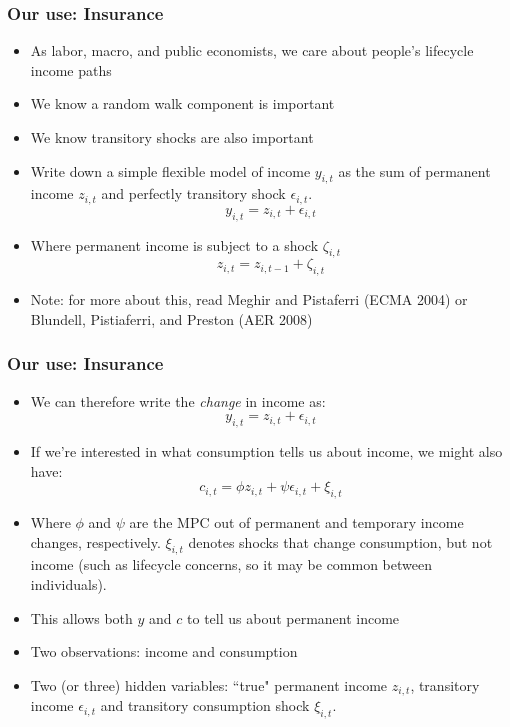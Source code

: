 \documentclass{beamer}
\begin{document}
\begin{frame}
\frametitle[alignment=center]{Our use: Insurance}
\begin{itemize}
\item As labor, macro, and public economists, we care about people's lifecycle income paths
\bigskip
\item We know a random walk component is important
\bigskip
\item We know transitory shocks are also important
\bigskip
\item Write down a simple flexible model of income $y_{i,t}$ as the sum of permanent income $z_{i,t}$ and perfectly transitory shock $\epsilon_{i,t}$.
$$y_{i,t}=z_{i,t}+\epsilon_{i,t}$$
\item Where permanent income is subject to a shock $\zeta_{i,t}$
$$z_{i,t}=z_{i,t-1}+\zeta_{i,t}$$
\item Note:  for more about this, read Meghir and Pistaferri (ECMA 2004) or Blundell, Pistiaferri, and Preston (AER 2008)
\end{itemize}
\end{frame}


\begin{frame}
\frametitle[alignment=center]{Our use: Insurance}
\begin{itemize}
\item We can therefore write the \emph{change} in income as:
$$y_{i,t}=z_{i,t}+\epsilon_{i,t}$$
\item If we're interested in what consumption tells us about income, we might also have:
$$c_{i,t}=\phi z_{i,t}+\psi \epsilon_{i,t}+\xi_{i,t}$$
\item Where $\phi$ and $\psi$ are the MPC out of permanent and temporary income changes, respectively.  $\xi_{i,t}$ denotes shocks that change consumption, but not income (such as lifecycle concerns, so it may be common between individuals).  
\bigskip
\item This allows both $y$ and $c$ to tell us about permanent income 
\bigskip
\item Two observations:  income and consumption
\bigskip
\item Two (or three) hidden variables:  ``true" permanent income $z_{i,t}$, transitory income $\epsilon_{i,t}$ and transitory consumption shock $\xi_{i,t}$.
\end{itemize}
\end{frame}
\end{document}
